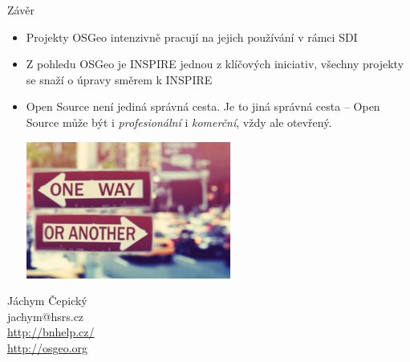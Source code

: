 \documentclass[xcolor=dvipsnames]{beamer}
\begin{document}
\begin{frame}{Závěr}

  \begin{itemize}
  \item
    Projekty OSGeo intenzivně pracují na jejich používání v rámci SDI
  \item
    Z pohledu OSGeo je INSPIRE jednou z klíčových iniciativ, všechny projekty se
    snaží o úpravy směrem k INSPIRE
  \item Open Source není jediná správná cesta. Je to jiná správná cesta --
      Open Source může být i {\em profesionální} i {\em komerční}, vždy ale
      \alert{otevřený}.

\begin{center} 
    \includegraphics[height=4.5cm]{imgs/ils/oneway.png}
\end{center}
  
\end{itemize}
  
\end{frame}


\begin{frame}
    \begin{center}
        Jáchym Čepický \\
        jachym@hsrs.cz \\
        \url{http://bnhelp.cz/} \\
        \url{http://osgeo.org}
    \end{center}
\end{frame}
\end{document}
